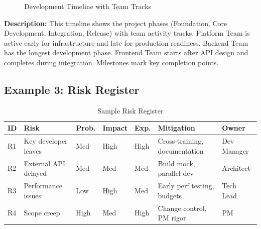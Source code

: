 \documentclass[11pt,letterpaper]{article}
\begin{document}
\begin{figure}[H]
\caption{Development Timeline with Team Tracks}
\end{figure}

\textbf{Description:} This timeline shows the project phases (Foundation, Core Development, Integration, Release) with team activity tracks. Platform Team is active early for infrastructure and late for production readiness. Backend Team has the longest development phase. Frontend Team starts after API design and completes during integration. Milestones mark key completion points.

\subsection{Example 3: Risk Register}

\begin{table}[H]
\centering
\caption{Sample Risk Register}
\footnotesize
\begin{tabular}{@{}L{0.5cm}L{2.5cm}C{1cm}C{1cm}C{1cm}L{3cm}L{2cm}@{}}
\toprule
\textbf{ID} & \textbf{Risk} & \textbf{Prob.} & \textbf{Im\-pact} & \textbf{Exp.} & \textbf{Mitigation} & \textbf{Owner} \\
\midrule
R1 & Key developer leaves & Med & High & High & Cross-training, documentation & Dev Manager \\
\addlinespace
R2 & External API delayed & Med & Med & Med & Build mock, parallel dev & Architect \\
\addlinespace
R3 & Performance issues & Low & High & Med & Early perf testing, budgets & Tech Lead \\
\addlinespace
R4 & Scope creep & High & Med & High & Change control, PM rigor & PM \\
\bottomrule
\end{tabular}
\end{table}
\end{document}
